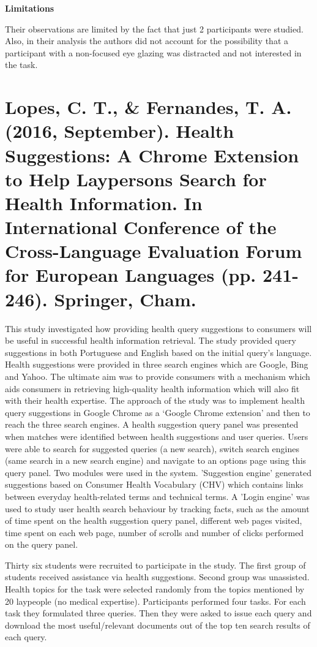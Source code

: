 \documentclass[]{article}
\begin{document}
\textbf{Limitations}

Their observations are limited by the fact that just 2 participants were studied. Also, in their analysis the authors did not account for the possibility that a participant with a non-focused eye glazing was distracted and not interested in the task.

\section{Lopes, C. T., \& Fernandes, T. A. (2016, September). Health Suggestions: A Chrome Extension to Help Laypersons Search for Health Information. In International Conference of the Cross-Language Evaluation Forum for European Languages (pp. 241-246). Springer, Cham.}

This study investigated how providing health query suggestions to consumers will be useful in successful health information retrieval. The study provided query suggestions in both Portuguese and English based on the initial query's language. Health suggestions were provided in three search engines which are Google, Bing and Yahoo. The ultimate aim was to provide consumers with a mechanism which aids consumers in retrieving high-quality health information which will also fit with their health expertise. The approach of the study was to implement health query suggestions in Google Chrome as a ‘Google Chrome extension’ and then to reach the three search engines. A health suggestion query panel was presented when matches were identified between health suggestions and user queries. Users were able to search for suggested queries (a new search), switch search engines (same search in a new search engine) and navigate to an options page using this query panel. Two modules were used in the system. 'Suggestion engine' generated suggestions based on Consumer Health Vocabulary (CHV) which contains links between everyday health-related terms and technical terms. A 'Login engine' was used to study user health search behaviour by tracking facts, such as the amount of time spent on the health suggestion query panel, different web pages visited, time spent on each web page, number of scrolls and number of clicks performed on the query panel. 

Thirty six students were recruited to participate in the study. The first group of students received assistance via health suggestions. Second group was unassisted. Health topics for the task were selected randomly from the topics mentioned by 20 laypeople (no medical expertise). Participants performed four tasks. For each task they formulated three queries. Then they were asked to issue each query and download the most useful/relevant documents out of the top ten search results of each query. 
\end{document}
